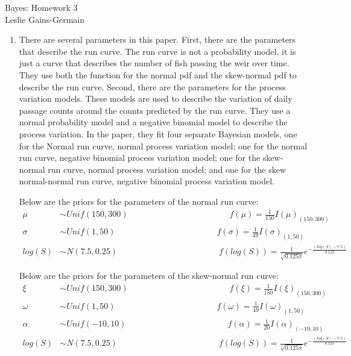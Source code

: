 \documentclass[12pt]{article}\usepackage[]{graphicx}\usepackage[]{color}
\begin{document}
  
  
\begin{center}
\large{Bayes: Homework $3$} \\
Leslie Gains-Germain
\end{center}

\begin{doublespacing}

\begin{enumerate}

\item There are several parameters in this paper. First, there are the parameters that describe the run curve. The run curve is not a probability model, it is just a curve that describes the number of fish passing the weir over time. They use both the function for the normal pdf and the skew-normal pdf to describe the run curve. Second, there are the parameters for the process variation models. These models are used to describe the variation of daily passage counts around the counts predicted by the run curve. They use a normal probability model and a negative binomial model to describe the process variation. In the paper, they fit four separate Bayesian models, one for the Normal run curve, normal process variation model; one for the normal run curve, negative binomial process variation model; one for the skew-normal run curve, normal process variation model; and one for the skew normal-normal run curve, negative binomial process variation model.

Below are the priors for the parameters of the normal run curve:
\begin{align*}
\mu &\sim Unif(150, 300) \hspace{2in} f(\mu) = \frac{1}{150} I(\mu)_{(150, 300)} \\
\sigma &\sim Unif(1, 50) \hspace{2in} f(\sigma) = \frac{1}{49} I(\sigma)_{(1, 50)} \\
log(S) &\sim N(7.5, 0.25) \hspace{2in} 
f(log(S)) = \frac{1}{\sqrt{0.125\pi}}e^{-\frac{(log(S)-7.5)}{0.125}}  
\end{align*}

Below are the priors for the parameters of the skew-normal run curve:
\begin{align*}
\xi &\sim Unif(150, 300) \hspace{2in} f(\xi) = \frac{1}{150} I(\xi)_{(150, 300)} \\
\omega &\sim Unif(1, 50) \hspace{2in} f(\omega) = \frac{1}{49} I(\omega)_{(1, 50)} \\
\alpha &\sim Unif(-10, 10) \hspace{2in} f(\alpha) = \frac{1}{20} I(\alpha)_{(-10, 10)} \\
log(S) &\sim N(7.5, 0.25) \hspace{2in} 
f(log(S)) = \frac{1}{\sqrt{0.125\pi}}e^{-\frac{(log(S)-7.5)}{0.125}}  
\end{align*}


\end{enumerate}
\end{doublespacing}
\end{document}
